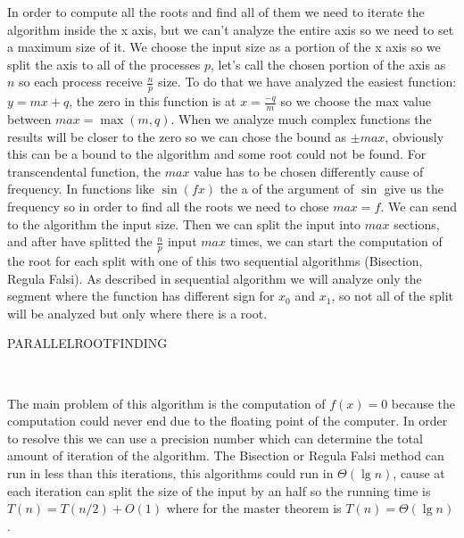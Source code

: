 \documentclass[a4paper,11pt,oneside]{book}
\begin{document}
In order to compute all the roots and find all of them we need to iterate the algorithm inside the x axis, but we can't analyze the entire axis so we need to set a maximum size of it. We choose the input size as a portion of the x axis so we split the axis to all of the processes $p$, let's call the chosen portion of the axis as $n$ so each process receive $\frac{n}{p}$ size. To do that we have analyzed the easiest function: $y=mx+q$, the zero in this function is at $x=\frac{-q}{m}$ so we choose the max value between $max = \max(m,q)$. When we analyze much complex functions the results will be closer to the zero so we can chose the bound as $\pm max$, obviously this can be a bound to the algorithm and some root could not be found. For transcendental function, the $max$ value has to be chosen differently cause of frequency. In functions like $\sin (fx)$ the a of the argument of $\sin$ give us the frequency so in order to find all the roots we need to chose $max = f$. We can send to the algorithm the input size. Then we can split the input into $max$ sections, and after have splitted the $\frac{n}{p}$ input $max$ times, we can start the computation of the root for each split with one of this two sequential algorithms (Bisection, Regula Falsi). As described in sequential algorithm we will analyze only the segment where the function has different sign for $x_0$ and $x_1$, so not all of the split will be analyzed but only where there is a root. 




\begin{algorithm}[H]
\caption{PARALLELROOTFINDING}
\begin{algorithmic}[1]
\Statex\
	\EndFor
\end{algorithmic}
\end{algorithm}


\noindent The main problem of this algorithm is the computation of $f(x)=0$ because the computation could never end due to the floating point of the computer. In order to resolve this we can use a precision number which can determine the total amount of iteration of the algorithm. The Bisection or Regula Falsi method can run in less than this iterations, this algorithms could run in $\Theta(\lg n)$, cause at each iteration can split the size of the input by an half so the running time is $T(n) = T(n/2) + O(1)$ where for the master theorem is $T(n) = \Theta(\lg n)$. 
\end{document}

